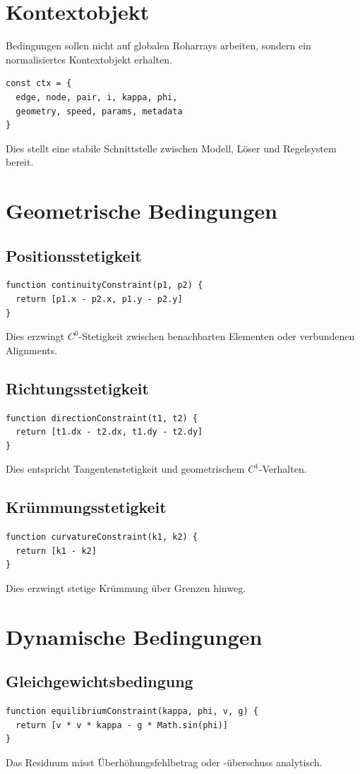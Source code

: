 \section{Kontextobjekt}
Bedingungen sollen nicht auf globalen Roharrays arbeiten, sondern ein
normalisiertes Kontextobjekt erhalten.
\begin{verbatim}
const ctx = {
  edge, node, pair, i, kappa, phi,
  geometry, speed, params, metadata
}
\end{verbatim}
Dies stellt eine stabile Schnittstelle zwischen Modell, Löser und Regelsystem
bereit.

\section{Geometrische Bedingungen}
\subsection{Positionsstetigkeit}
\begin{verbatim}
function continuityConstraint(p1, p2) {
  return [p1.x - p2.x, p1.y - p2.y]
}
\end{verbatim}
Dies erzwingt \(C^0\)-Stetigkeit zwischen benachbarten Elementen oder
verbundenen Alignments.

\subsection{Richtungsstetigkeit}
\begin{verbatim}
function directionConstraint(t1, t2) {
  return [t1.dx - t2.dx, t1.dy - t2.dy]
}
\end{verbatim}
Dies entspricht Tangentenstetigkeit und geometrischem \(C^1\)-Verhalten.

\subsection{Krümmungsstetigkeit}
\begin{verbatim}
function curvatureConstraint(k1, k2) {
  return [k1 - k2]
}
\end{verbatim}
Dies erzwingt stetige Krümmung über Grenzen hinweg.

\section{Dynamische Bedingungen}
\subsection{Gleichgewichtsbedingung}
\begin{verbatim}
function equilibriumConstraint(kappa, phi, v, g) {
  return [v * v * kappa - g * Math.sin(phi)]
}
\end{verbatim}
Das Residuum misst Überhöhungsfehlbetrag oder -überschuss analytisch.

